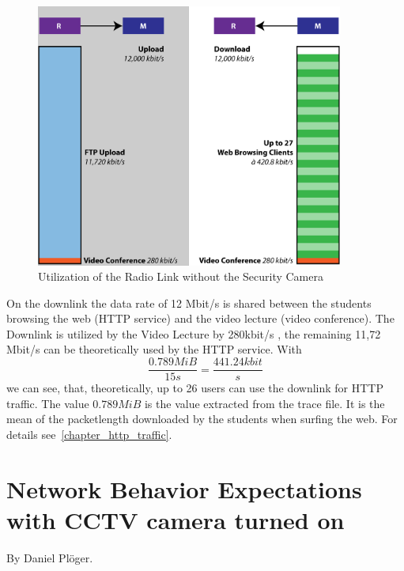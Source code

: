 \documentclass[a4paper,10pt]{book}\usepackage{graphicx}
\begin{document}
\begin{figure}[!ht]
  \centering
    \includegraphics[width=0.9\textwidth]{graphics-02.png}
    
    \caption{Utilization of the Radio Link without the Security Camera}
\end{figure}

On the downlink the data rate of 12 Mbit/s is shared between the students browsing the web (HTTP service) and the video lecture (video conference).
The Downlink is utilized by the Video Lecture by 280kbit/s , the remaining 11,72 Mbit/s can be theoretically used by the HTTP service. With 
\begin{equation}
 \frac{0.789 MiB}{15s}=\frac{441.24 kbit}{s}
\end{equation}
we can see, that, theoretically, up to 26 users can use the downlink for HTTP traffic. The value $0.789MiB$ is the value extracted from the trace file. It is the mean of the packetlength downloaded by the students when surfing the web. For details see~\ref{chapter_http_traffic}.

\section{Network Behavior Expectations with CCTV camera turned on}
\label{chapter_expectations}
By Daniel Plöger.\\
\end{document}
